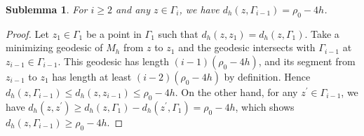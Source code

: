 \documentclass[11pt,letterpaper]{amsart}
\numberwithin{equation}{section}
\theoremstyle{definition}
\theoremstyle{plain}
\theoremstyle{definition}
\theoremstyle{plain}
\newtheorem{sublemma1}[sublemmainitial]{Sublemma}
\theoremstyle{definition}
\theoremstyle{plain}
\begin{document}
\begin{sublemma1}\label{sublemma1}
For $i\geqslant 2$ and any $z\in \Gamma_i$, we have $d_h(z,\Gamma_{i-1})=\rho_0-4h$.
\end{sublemma1}
\begin{proof}
Let $z_1\in \Gamma_1$ be a point in $\Gamma_1$ such that $d_h(z,z_1)=d_h(z,\Gamma_1)$. Take a minimizing geodesic of $M_h$ from $z$ to $z_1$ and the geodesic intersects with $\Gamma_{i-1}$ at $z_{i-1}\in\Gamma_{i-1}$. This geodesic has length $(i-1)(\rho_0-4h)$, and its segment from $z_{i-1}$ to $z_1$ has length at least $(i-2)(\rho_0-4h)$ by definition. Hence $d_h(z,\Gamma_{i-1})\leqslant d_h(z,z_{i-1})\leqslant \rho_0-4h$. On the other hand, for any $z^{\prime}\in\Gamma_{i-1}$, we have $d_h(z,z^{\prime})\geqslant d_h(z,\Gamma_1)-d_h(z^{\prime},\Gamma_1)=\rho_0-4h$, which shows $d_h(z,\Gamma_{i-1})\geqslant \rho_0-4h$.
\end{proof}
\end{document}
